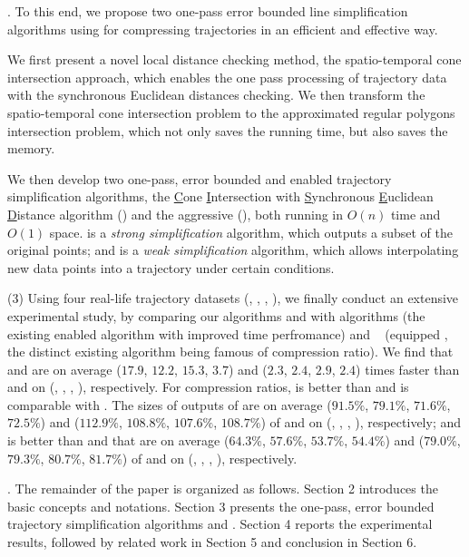 .
To this end, we propose two one-pass error bounded line simplification algorithms using \sed for compressing trajectories in an efficient and effective way.

 We first present a novel local distance checking method, \ie the spatio-temporal cone intersection approach, which enables the one pass processing of trajectory data with the synchronous Euclidean distances checking. We then transform the spatio-temporal cone intersection problem to the approximated regular polygons intersection problem, which not only saves the running time, but also saves the memory.

 We then develop two one-pass, error bounded and \sed enabled trajectory simplification algorithms, \ie the \underline{C}one \underline{I}ntersection with \underline{S}ynchronous \underline{E}uclidean \underline{D}istance algorithm (\cist) and the aggressive \cist (\cista), both running in $O(n)$ time and $O(1)$ space.
\cist is a \emph{strong simplification}\cite{Trajcevski:DDR} algorithm, which outputs a subset of the original points;
and \cista is a \emph{weak simplification}\cite{Trajcevski:DDR} algorithm, which allows interpolating new data points into a trajectory under certain conditions.


\stab (3) Using four real-life trajectory datasets (\truck, \sercar, \geolife, \pricar),
we finally conduct an extensive experimental study, by comparing our algorithms \cist and \cista with algorithms \squishe \cite{Muckell:Compression} (the existing \sed enabled \lsa algorithm with improved time perfromance) and \dps~\cite{Meratnia:Spatiotemporal} (\sed equipped \dpa, the distinct existing \lsa algorithm being famous of compression ratio).
%
We find that \cist and \cista are on average ($17.9$, $12.2$, $15.3$, \textcolor[rgb]{1.00,0.00,0.00}{{$3.7$}}) and ($2.3$, $2.4$, $2.9$, {$2.4$}) times faster than \dps and \squishe on (\truck, \sercar, \geolife, \pricar), respectively.
%
For compression ratios, \cist is better than \squishe and is comparable with \dps. The sizes of outputs of \cist are on average ($91.5\%$, $79.1\%$, $71.6\%$, {$72.5\%$}) and ($112.9\%$, $108.8\%$, $107.6\%$, $108.7\%$) of \squishe and \dps on (\truck, \sercar, \geolife, \pricar), respectively; and \cista is better than \squishe and \dps that are on average ($64.3\%$, $57.6\%$, $53.7\%$, {$54.4\%$}) and ($79.0\%$, $79.3\%$, $80.7\%$, $81.7\%$) of \squishe and \dps on (\truck, \sercar, \geolife, \pricar), respectively.


.
The remainder of the paper is organized as follows.
Section 2 introduces the basic concepts and notations.
Section 3 presents the one-pass, error bounded trajectory simplification algorithms \cist and \cista.
Section 4 reports the experimental results, followed by related work in
Section 5 and conclusion in Section 6.






